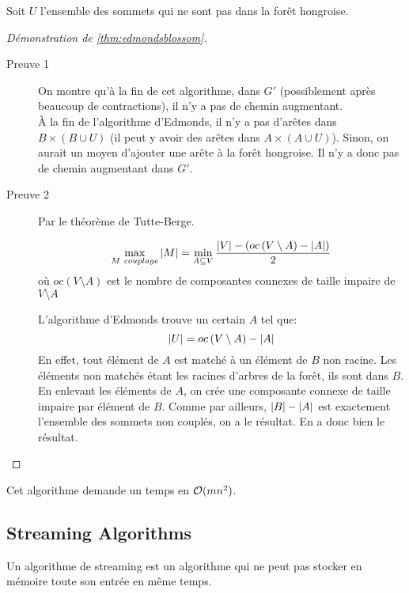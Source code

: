 \documentclass[math, info]{cours}
\begin{document}
Soit $U$ l'ensemble des sommets qui ne sont pas dans la forêt hongroise.

\begin{proof}[Démonstration de \ref{thm:edmondsblossom}]
	\begin{description}
		\item[Preuve 1] On montre qu'à la fin de cet algorithme, dans $G'$ (possiblement après beaucoup de contractions), il n'y a pas de chemin augmentant.\\
				À la fin de l'algorithme d'Edmonds, il n'y a pas d'arêtes dans $B \times \left(B \cup U \right)$ (il peut y avoir des arêtes dans $A \times \left( A\cup U \right)$).
				Sinon, on aurait un moyen d'ajouter une arête à la forêt hongroise.
				Il n'y a donc pas de chemin augmentant dans $G'$.
		 \item[Preuve 2] Par le théorème de Tutte-Berge.
			 \begin{thm}
				 \begin{equation*}
				 	\max_{M \ couplage} \left|M\right| = \min_{A \subseteq V}\frac{\left|V\right| - \left(oc\left(V \setminus A \right) - \left|A\right| \right)}{2}
				\end{equation*}
				où $oc(V \setminus A)$ est le nombre de composantes connexes de taille impaire de $V \setminus A$
			 \end{thm}
			 L'algorithme d'Edmonds trouve un certain $A$ tel que:
			 \begin{equation*}
				 \left|U\right| = oc\left(V\setminus A \right) - \left|A\right|
			 \end{equation*}
			 En effet, tout élément de $A$ est matché à un élément de $B$ non racine.
			 Les éléments non matchés étant les racines d'arbres de la forêt, ils sont dans $B$.
			 En enlevant les éléments de $A$, on crée une composante connexe de taille impaire par élément de $B$.
			 Comme par ailleurs, $\left|B\right| - \left|A\right|$ est exactement l'ensemble des sommets non couplés, on a le résultat.
			 En a donc bien le résultat.
	\end{description}
\end{proof}

\begin{thm}
	Cet algorithme demande un temps en $\mathcal{O}(mn^{2})$.
	\label{prop:edmondsblossomtimecomplexity}
\end{thm}

\subsection{Streaming Algorithms}
\begin{definition}
	Un algorithme de streaming est un algorithme qui ne peut pas stocker en mémoire toute son entrée en même temps.
	\label{def:streamingalgorithm}
\end{definition}
\end{document}

